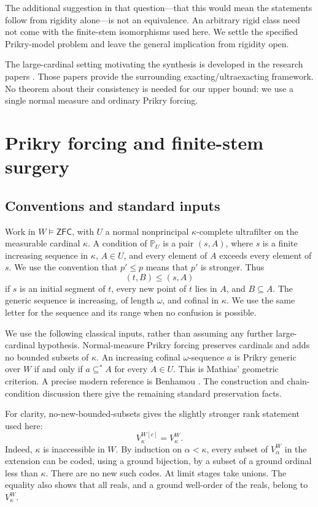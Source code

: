 \documentclass[11pt,letterpaper]{article}
\theoremstyle{definition}
\numberwithin{equation}{section}
\newcommand{\ZFC}{\mathsf{ZFC}}
\begin{document}
The additional suggestion in that question---that this would mean the statements follow from rigidity alone---is not an equivalence. An arbitrary rigid class need not come with the finite-stem isomorphisms used here. We settle the specified Prikry-model problem and leave the general implication from rigidity open.

The large-cardinal setting motivating the synthesis is developed in the research papers \cite{abl,abgl}. Those papers provide the surrounding exacting/ultraexacting framework. No theorem about their consistency is needed for our upper bound: we use a single normal measure and ordinary Prikry forcing.

\section{Prikry forcing and finite-stem surgery}\label{sec:surgery}

\subsection{Conventions and standard inputs}

Work in $W\models\ZFC$, with $U$ a normal nonprincipal $\kappa$-complete ultrafilter on the measurable cardinal $\kappa$. A condition of $\mathbb P_U$ is a pair $(s,A)$, where $s$ is a finite increasing sequence in $\kappa$, $A\in U$, and every element of $A$ exceeds every element of $s$. We use the convention that $p'\leq p$ means that $p'$ is stronger. Thus
\[
 (t,B)\leq(s,A)
\]
if $s$ is an initial segment of $t$, every new point of $t$ lies in $A$, and $B\subseteq A$. The generic sequence is increasing, of length $\omega$, and cofinal in $\kappa$. We use the same letter for the sequence and its range when no confusion is possible.

We use the following classical inputs, rather than assuming any further large-cardinal hypothesis. Normal-measure Prikry forcing preserves cardinals and adds no bounded subsets of $\kappa$. An increasing cofinal $\omega$-sequence $a$ is Prikry generic over $W$ if and only if $a\subseteq^*A$ for every $A\in U$. This is Mathias' geometric criterion. A precise modern reference is Benhamou \cite[Theorem 3.14, Corollary 3.15, and Theorem 3.17]{benhamou}. The construction and chain-condition discussion there give the remaining standard preservation facts.

For clarity, no-new-bounded-subsets gives the slightly stronger rank statement used here:
\begin{equation}\label{eq:rankpres}
 V_\kappa^{W[c]}=V_\kappa^W.
\end{equation}
Indeed, $\kappa$ is inaccessible in $W$. By induction on $\alpha<\kappa$, every subset of $V_\alpha^W$ in the extension can be coded, using a ground bijection, by a subset of a ground ordinal less than $\kappa$. There are no new such codes. At limit stages take unions. The equality also shows that all reals, and a ground well-order of the reals, belong to $V_\kappa^W$.
\end{document}

